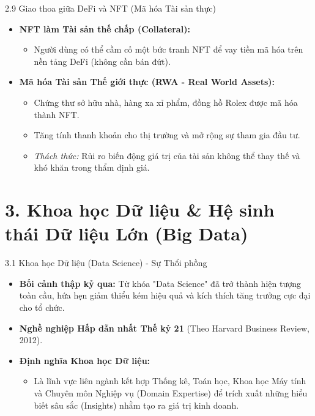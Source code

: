 \documentclass[aspectratio=169]{beamer}
\begin{document}
\begin{frame}{2.9 Giao thoa giữa DeFi và NFT (Mã hóa Tài sản thực)}
    \begin{itemize}
        \item \textbf{NFT làm Tài sản thế chấp (Collateral):} 
        \begin{itemize}
            \item Người dùng có thể cầm cố một bức tranh NFT để vay tiền mã hóa trên nền tảng DeFi (không cần bán đứt).
        \end{itemize}
        \item \textbf{Mã hóa Tài sản Thế giới thực (RWA - Real World Assets):}
        \begin{itemize}
            \item Chứng thư sở hữu nhà, hàng xa xỉ phẩm, đồng hồ Rolex được mã hóa thành NFT.
            \item Tăng tính thanh khoản cho thị trường và mở rộng sự tham gia đầu tư.
            \item \emph{Thách thức:} Rủi ro biến động giá trị của tài sản không thể thay thế và khó khăn trong thẩm định giá.
        \end{itemize}
    \end{itemize}
\end{frame}

\section{3. Khoa học Dữ liệu \& Hệ sinh thái Dữ liệu Lớn (Big Data)}

\begin{frame}{3.1 Khoa học Dữ liệu (Data Science) - Sự Thổi phồng}
    \begin{itemize}
        \item \textbf{Bối cảnh thập kỷ qua:} Từ khóa "Data Science" đã trở thành hiện tượng toàn cầu, hứa hẹn giảm thiểu kém hiệu quả và kích thích tăng trưởng cực đại cho tổ chức.
        \item \textbf{Nghề nghiệp Hấp dẫn nhất Thế kỷ 21} (Theo Harvard Business Review, 2012).
        \item \textbf{Định nghĩa Khoa học Dữ liệu:}
        \begin{itemize}
            \item Là lĩnh vực liên ngành kết hợp Thống kê, Toán học, Khoa học Máy tính và Chuyên môn Nghiệp vụ (Domain Expertise) để trích xuất những hiểu biết sâu sắc (Insights) nhằm tạo ra giá trị kinh doanh.
        \end{itemize}
    \end{itemize}
\end{frame}
\end{document}

